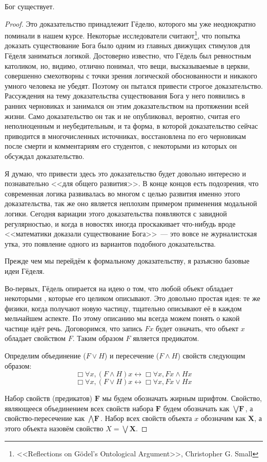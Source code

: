 \begin{thm}
Бог существует.
\end{thm}
\begin{proof}
Это доказательство принадлежит Гёделю, которого мы уже неоднократно поминали в нашем курсе. Некоторые исследователи считают\footnote{<<Reflections on Gödel’s Ontological Argument>>, Christopher G. Small}, что попытка доказать существование Бога было одним из главных движущих стимулов для Гёделя заниматься логикой. Достоверно известно, что Гёдель был ревностным католиком, но, видимо, отлично понимал, что вещи, высказываемые в церкви, совершенно смехотворны с точки зрения логической обоснованности и никакого умного человека не убедят. Поэтому он пытался привести строгое доказательство. Рассуждения на тему доказательства существования Бога у него появились в ранних черновиках и занимался он этим доказательством на протяжении всей жизни. Само доказательство он так и не опубликовал, вероятно, считая его неполноценным и неубедительным, и та форма, в которой доказательство сейчас приводится в многочисленных источниках, восстановлена по его черновикам после смерти и комментариям его студентов, с некоторыми из которых он обсуждал доказательство.

Я думаю, что привести здесь это доказательство будет довольно интересно и познавательно <<для общего развития>>. В конце концов есть подозрения, что современная логика развивалась во многом с целью развития именно этого доказательства, так же оно является неплохим примером применения модальной логики. Сегодня вариации этого доказательства появляются с завидной регулярностью, и когда в новостях иногда проскакивает что-нибудь вроде <<математики доказали существование Бога>>~--- это вовсе не журналистская утка, это появление одного из вариантов подобного доказательства.

Прежде чем мы перейдём к формальному доказательству, я разъясню базовые идеи Гёделя.

Во-первых, Гёдель опирается на идею о том, что любой объект обладает некоторыми , которые его целиком описывают. Это довольно простая идея: те же физики, когда получают новую частицу, тщательно описывают её в каждом мельчайшем аспекте. По этому описанию мы всегда можем понять о какой частице идёт речь. Договоримся, что запись $Fx$ будет означать, что объект $x$ обладает свойством $F$. Таким образом $F$ является предикатом.

Определим объединение ($F\lor H$) и пересечение ($F \land H$) свойств следующим образом:
$$\Box \forall x, (F\land H) x \leftrightarrow \Box \forall x, Fx\land Hx$$
$$\Box \forall x, (F\lor H) x \leftrightarrow \Box \forall x, Fx\lor Hx$$


Набор свойств (предикатов) $\textbf{F}$ мы будем обозначать жирным шрифтом. Свойство, являющееся объединением всех свойств набора $\textbf{F}$ будем обозначать как $\bigvee\textbf{F}$, а свойство-пересечение как $\bigwedge\textbf{F}$. Набор всех свойств объекта $x$ обозначим как $\textbf{X}$, а  этого объекта назовём свойство $X = \bigvee \textbf{X}$.


\end{proof}


